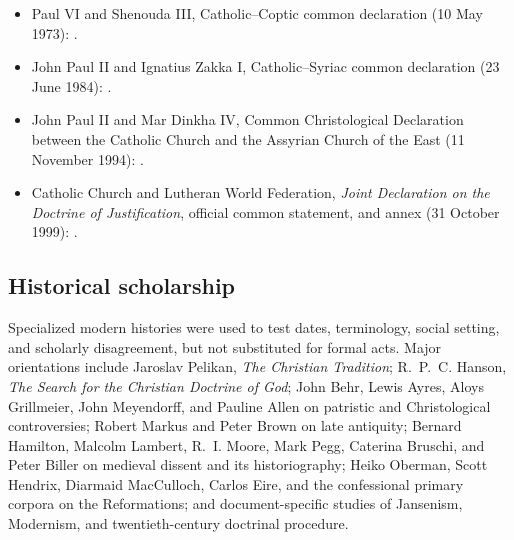 \begin{itemize}
  \item Paul VI and Shenouda III, Catholic--Coptic common declaration (10 May 1973): .
  \item John Paul II and Ignatius Zakka I, Catholic--Syriac common declaration (23 June 1984): .
  \item John Paul II and Mar Dinkha IV, Common Christological Declaration between the Catholic Church and the Assyrian Church of the East (11 November 1994): .
  \item Catholic Church and Lutheran World Federation, \emph{Joint Declaration on the Doctrine of Justification}, official common statement, and annex (31 October 1999): .
\end{itemize}

\subsection{Historical scholarship}

Specialized modern histories were used to test dates, terminology, social setting, and scholarly disagreement, but not substituted for formal acts. Major orientations include Jaroslav Pelikan, \emph{The Christian Tradition}; R.~P.~C. Hanson, \emph{The Search for the Christian Doctrine of God}; John Behr, Lewis Ayres, Aloys Grillmeier, John Meyendorff, and Pauline Allen on patristic and Christological controversies; Robert Markus and Peter Brown on late antiquity; Bernard Hamilton, Malcolm Lambert, R.~I. Moore, Mark Pegg, Caterina Bruschi, and Peter Biller on medieval dissent and its historiography; Heiko Oberman, Scott Hendrix, Diarmaid MacCulloch, Carlos Eire, and the confessional primary corpora on the Reformations; and document-specific studies of Jansenism, Modernism, and twentieth-century doctrinal procedure.

\endgroup
